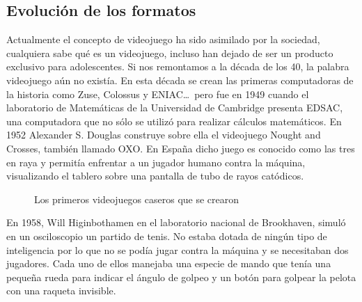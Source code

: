 \subsection{Evolución de los formatos}

Actualmente el concepto de videojuego ha sido asimilado por la sociedad, cualquiera sabe qué es un videojuego, incluso han dejado de ser un producto exclusivo para adolescentes. Si nos remontamos a la década de los 40, la palabra videojuego aún no existía. En esta década se crean las primeras computadoras de la historia como Zuse, Colossus y ENIAC\ldots\ pero fue en 1949 cuando el laboratorio de Matemáticas de la Universidad de Cambridge presenta EDSAC, una computadora que no sólo se utilizó para realizar cálculos matemáticos. En 1952 Alexander S. Douglas construye sobre ella el videojuego Nought and Crosses, también llamado OXO. En España dicho juego es conocido como las tres en raya y permitía enfrentar a un jugador humano contra la máquina, visualizando el tablero sobre una pantalla de tubo de rayos catódicos.
\newline

\begin{figure}[!h]
	\centering	
	\caption{Los primeros videojuegos caseros que se crearon}
\end{figure}

En 1958, Will Higinbothamen en el laboratorio nacional de Brookhaven, simuló en un osciloscopio un partido de tenis. No estaba dotada de ningún tipo de inteligencia por lo que no se podía jugar contra la máquina y se necesitaban dos jugadores. Cada uno de ellos manejaba una especie de mando que tenía una pequeña rueda para indicar el ángulo de golpeo y un botón para golpear la pelota con una raqueta invisible. 
\newline

